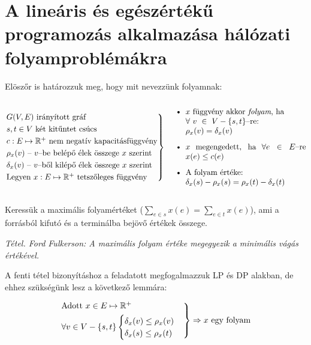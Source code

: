 \newpage
\section{A lineáris és egészértékű programozás alkalmazása hálózati folyamproblémákra}

Elöszőr is határozzuk meg, hogy mit nevezzünk folyamnak: 

\[	
\begin{rcases}
G(V,E) \mbox{ irányított gráf} \\
s,t \in V \mbox{ két kitűntet csúcs} \\
c : E \mapsto \mathbb{R}^+ \mbox{ nem negatív kapacitásfüggvény}\\
\rho_x(v) \mbox{ -- } v\mbox{--be belépő élek összege } x \mbox{ szerint} \\
\delta_x(v) \mbox{ -- } v\mbox{--ből kilépő élek összege } x \mbox{ szerint}\\
\mbox{Legyen }x : E \mapsto \mathbb{R}^+ \mbox{ tetszőleges függvény}
\end{rcases} \parbox[c]{6.2cm}{
\begin{itemize}
  \item $x$ függvény akkor \emph{folyam}, ha \\ $\forall~v~\in~V - \{s,t\}$--re: \\ $\rho_x(v)=\delta_x(v)$
  \item $x$ megengedett, ha $\forall e \in E$--re $x(e) \leq c(e)$
  \item A folyam értéke: \\ $\delta_x(s)-\rho_x(s)=\rho_x(t)-\delta_x(t)$
\end{itemize}
}
\]

Keressük a maximális folyamértéket ($\sum_{e \in s}x(e)=\sum_{e \in t}x(e)$),
ami a forrásból kifutó és a terminálba bejövő értékek összege.

\vspace{0.4cm}
\emph{Tétel. Ford Fulkerson: A maximális folyam értéke megegyezik a minimális vágás értékével.}
\vspace{0.4cm}

A fenti tétel bizonyításhoz a feladatott megfogalmazzuk LP és DP alakban, de
ehhez szükségünk lesz a következő lemmára:

\[
\begin{rcases}
\mbox{Adott } x \in E \mapsto \mathbb{R}^+\\
\forall v \in V - \{s,t\} \begin{cases}
\delta_x(v) \leq \rho_x(v) \\
\delta_x(s) \leq \rho_x(t)
\end{cases} 
\end{rcases}
\Rightarrow  x \mbox{ egy folyam}
\]

